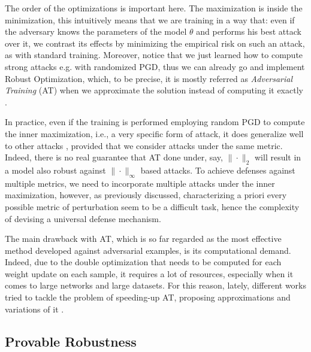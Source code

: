 \documentclass[LaM,binding=0.6cm]{./packages/sapthesis/sapthesis}
\begin{document}
                The order of the optimizations is important here. The maximization is inside the minimization, this
                intuitively means that we are training in a way that: even if the adversary knows the 
                parameters of the model $\theta$ and performs his best attack over it, we contrast
                its effects by minimizing the empirical risk on such an attack, as with standard training.
                Moreover, notice that we just learned how to compute strong attacks e.g. with randomized PGD, thus we
                can already go and implement Robust Optimization, which, to be precise, it is mostly referred as \textit{Adversarial
                Training} (AT) when we approximate the solution instead of computing it exactly \cite{adv_survey2}.

                In practice, even if the training is performed employing random PGD to compute the inner maximization,
                i.e., a very specific form of attack, it does generalize well to other attacks \cite{madry_adv_training}, 
                provided that we consider attacks under the same metric. Indeed, there is no real guarantee that AT
                done under, say, $\|\cdot\|_2$ will result in a model also robust against $\|\cdot\|_{\infty}$ based 
                attacks. To achieve defenses against multiple metrics, we need to incorporate multiple attacks under the inner maximization,
                however, as previously discussed, characterizing a priori every possible metric of perturbation seem to be 
                a difficult task, hence the complexity of devising a universal defense mechanism.

                The main drawback with AT, which is so far regarded as the most effective method developed against adversarial
                examples, is its computational demand. Indeed, due to the double optimization that needs to be
                computed for each weight update on each sample, it requires a lot of resources, especially when it comes
                to large networks and large datasets. For this reason, lately, different works tried to tackle the
                problem of speeding-up AT, proposing approximations and variations of it \cite{free_adv_train}\cite{fast_adv_train}.

                
            
            \subsection{Provable Robustness}
\end{document}
